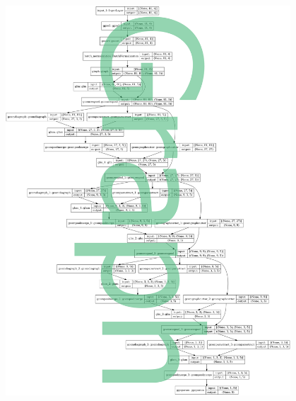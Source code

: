 \documentclass[hyperref={pdfpagelabels=false}]{beamer}
\begin{document}
\begin{frame}[label=]
\begin{columns}[c]
\begin{column}{0.48\textwidth}
\end{column}%
\hfill%
\begin{column}{0.48\textwidth}%
\begin{figure}[H] 
  \centering
\includegraphics[height=0.9\textheight]{../imgs/xgraphencode.png}
\label{fig:xgraphencodepng}
  \end{figure}


\end{column}%
\hfill%
\end{columns}

\end{frame}
\end{document}
